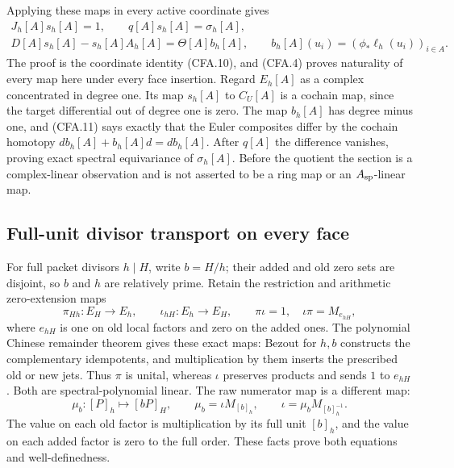Applying these maps in every active coordinate gives
\[
\begin{gathered}
 J_h[A]s_h[A]=1,\qquad q[A]s_h[A]=\sigma_h[A],\\
 D[A]s_h[A]-s_h[A]A_h[A]=\Theta[A]b_h[A],\qquad
 b_h[A](u_i)=(\phi_*\ell_h(u_i))_{i\in A}.
\end{gathered}                                                 \tag{CFA.11}
\]
The proof is the coordinate identity (CFA.10), and (CFA.4) proves
naturality of every map here under every face insertion.  Regard
$E_h[A]$ as a complex concentrated in degree one.  Its map $s_h[A]$
to $C_U[A]$ is a cochain map, since the target differential out of
degree one is zero.  The map $b_h[A]$ has degree minus one, and
(CFA.11) says exactly that the Euler composites differ by the cochain
homotopy $db_h[A]+b_h[A]d=db_h[A]$.  After $q[A]$ the difference
vanishes, proving exact spectral equivariance of $\sigma_h[A]$.
Before the quotient the section is a complex-linear observation and
is not asserted to be a ring map or an $A_{\rm sp}$-linear map.

\subsection{Full-unit divisor transport on every face}

For full packet divisors $h\mid H$, write $b=H/h$; their added and
old zero sets are disjoint, so $b$ and $h$ are relatively prime.
Retain the restriction and arithmetic zero-extension maps
\[
 \pi_{Hh}:E_H\to E_h,\qquad
 \iota_{hH}:E_h\to E_H,
 \qquad\pi\iota=1,\quad\iota\pi=M_{e_{hH}},                  \tag{CFA.12}
\]
where $e_{hH}$ is one on old local factors and zero on the added
ones.  The polynomial Chinese remainder theorem gives these exact
maps: Bezout for $h,b$ constructs the complementary idempotents,
and multiplication by them inserts the prescribed old or new jets.
Thus $\pi$ is unital, whereas $\iota$ preserves products and sends
$1$ to $e_{hH}$.  Both are spectral-polynomial linear.
The raw numerator map is a different map:
\[
 \mu_b:[P]_h\longmapsto[bP]_H,\qquad
 \mu_b=\iota M_{[b]_h},\qquad
 \iota=\mu_bM_{[b]_h^{-1}}.                                  \tag{CFA.13}
\]
The value on each old factor is multiplication by its full unit
$[b]_h$, and the value on each added factor is zero to the full order.
These facts prove both equations and well-definedness.

